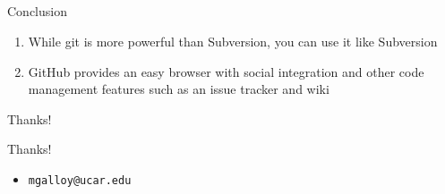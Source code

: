 \documentclass{beamer}
\begin{document}
\subsection*{}

\begin{frame}{Conclusion}
  \begin{enumerate}
    \item While git is more powerful than Subversion, you can use it like Subversion
    \item GitHub provides an easy browser with social integration and other code management features such as an issue tracker and wiki
  \end{enumerate}
\end{frame}

\begin{frame}{Thanks!}
  \begin{center}{\huge Thanks!}\end{center}
  \begin{itemize}
    \item {\tt mgalloy@ucar.edu}
  \end{itemize}
\end{frame}
\end{document}
